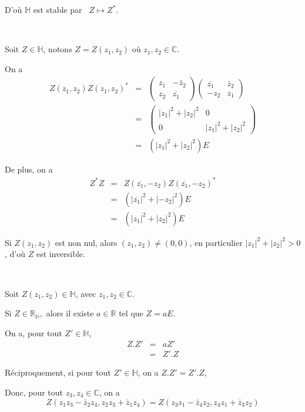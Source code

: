 D'o{\`u} $\mathbb{H}$ est stable par \ $Z \longmapsto Z^{\ast}$.

\

 Soit $Z \in \mathbb{H}$, notons $Z = Z (z_1, z_2)$ o{\`u}
$z_1, z_2 \in \mathbb{C}$.

On a
\begin{eqnarray*}
  Z (z_1, z_2) Z (z_1, z_2)^{\ast} & = & \left(\begin{array}{cc}
    z_1 & - \bar{z}_2\\
    z_2 & \overline{z_1}
  \end{array}\right) \left(\begin{array}{cc}
    \overline{z_1} & \bar{z}_2\\
    - z_2 & z_1
  \end{array}\right)\\
  & = & \left(\begin{array}{cc}
    | z_1 |^2 + | z_2 |^2 & 0\\
    0 & | z_1 |^2 + | z_2 |^2
  \end{array}\right)\\
  & = & (| z_1 |^2 + | z_2 |^2) E
\end{eqnarray*}


De plus, on a
\begin{eqnarray*}
  Z^{\ast} Z & = & Z (\overline{z_1}, - z_2) Z (\overline{z_1}, -
  z_2)^{\ast}\\
  & = & (| \overline{z_1} |^2 + | - z_2 |^2) E\\
  & = & (| z_1 |^2 + | z_2 |^2) E
\end{eqnarray*}


Si $Z (z_1, z_2)$ est non nul, alors $(z_1, z_2) \neq (0, 0)$, en particulier
$| z_1 |^2 + | z_2 |^2 > 0$, d'o{\`u} $Z$ est inversible.

\

 Soit $Z (z_1, z_2) \in \mathbb{H}$, avec $z_1, z_2 \in
\mathbb{C}$.

Si $Z \in \mathbb{R}_{\mathbb{H}},$ alors il existe $a \in \mathbb{R}$ tel que
$Z = a E$.

On a, pour tout $Z' \in \mathbb{H}$,
\begin{eqnarray*}
  Z.Z' & = & a Z'\\
  & = & Z' .Z
\end{eqnarray*}


R{\'e}ciproquement, si pour tout $Z' \in \mathbb{H}$, on a $Z.Z' = Z' .Z$,

Donc, pour tout $z_3, z_4 \in \mathbb{C}$, on a
\[ Z (z_1 z_3 - \bar{z}_2 z_4, z_2 z_3 + \bar{z}_1 z_4) = Z (z_3 z_1 -
   \bar{z}_4 z_2, z_4 z_1 + \bar{z}_3 z_2) \]


